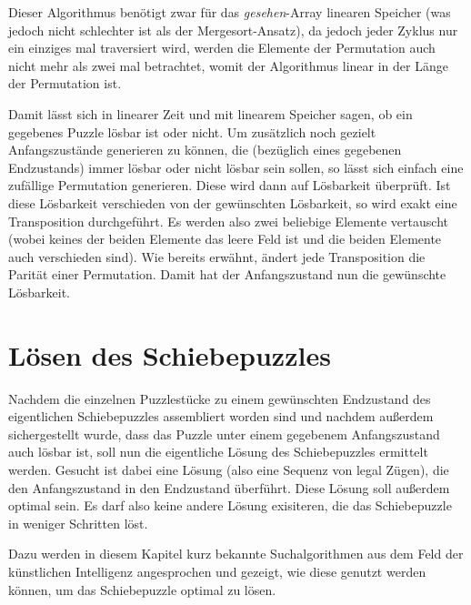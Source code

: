 \documentclass{whswinvcbook}
\begin{document}
Dieser Algorithmus benötigt zwar für das \textit{gesehen}-Array linearen Speicher (was jedoch nicht schlechter ist als der Mergesort-Ansatz), da jedoch jeder Zyklus nur ein einziges mal traversiert wird, werden die Elemente der Permutation auch nicht mehr als zwei mal betrachtet, womit der Algorithmus linear in der Länge der Permutation ist.

Damit lässt sich in linearer Zeit und mit linearem Speicher sagen, ob ein gegebenes Puzzle lösbar ist oder nicht. Um zusätzlich noch gezielt Anfangszustände generieren zu können, die (bezüglich eines gegebenen Endzustands) immer lösbar oder nicht lösbar sein sollen, so lässt sich einfach eine zufällige Permutation generieren. Diese wird dann auf Lösbarkeit überprüft. Ist diese Lösbarkeit verschieden von der gewünschten Lösbarkeit, so wird exakt eine Transposition durchgeführt. Es werden also zwei beliebige Elemente vertauscht (wobei keines der beiden Elemente das leere Feld ist und die beiden Elemente auch verschieden sind). Wie bereits erwähnt, ändert jede Transposition die Parität einer Permutation. Damit hat der Anfangszustand nun die gewünschte Lösbarkeit.
\chapter{Lösen des Schiebepuzzles}
Nachdem die einzelnen Puzzlestücke zu einem gewünschten Endzustand des eigentlichen Schiebepuzzles assembliert worden sind und nachdem außerdem sichergestellt wurde, dass das Puzzle unter einem gegebenem Anfangszustand auch lösbar ist, soll nun die eigentliche Lösung des Schiebepuzzles ermittelt werden. Gesucht ist dabei eine Lösung (also eine Sequenz von legal Zügen), die den Anfangszustand in den Endzustand überführt. Diese Lösung soll außerdem optimal sein. Es darf also keine andere Lösung exisiteren, die das Schiebepuzzle in weniger Schritten löst.

Dazu werden in diesem Kapitel kurz bekannte Suchalgorithmen aus dem Feld der künstlichen Intelligenz angesprochen und gezeigt, wie diese genutzt werden können, um das Schiebepuzzle optimal zu lösen.
\end{document}
